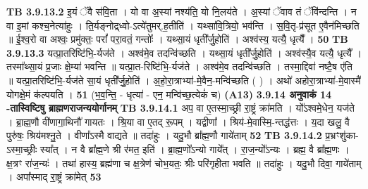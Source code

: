 \documentclass[17pt]{extarticle}
\begin{document}
{{{{{{{{{{{{{{{{{{{{{{                  \newline
                                \textbf{ TB 3.9.13.2} \newline
                  इ॒यं ॅवै स॑वि॒ता । यो वा अ॒स्यां नश्य॑ति॒ यो नि॒लय॑ते । अ॒स्यां ॅवाव तं ॅवि॑न्दन्ति । न वा इ॒मां कश्च॒नेत्या॑हुः । ति॒र्यङ्नोद्र्ध्वो-ऽत्ये॑तुमर्.ह॒तीति॑ । यथ्सा॑वि॒त्रियो॒ भव॑न्ति । स॒वि॒तृ-प्र॑सूत ए॒वैन॑मिच्छति ॥ ई॒श्व॒रो वा अश्वः॒ प्रमु॑क्तः॒ परां᳚ परा॒वतं॒ गन्तोः᳚ । यथ्सा॒यं धृती᳚र्जु॒होति॑ । अश्व॑स्य॒ यत्यै॒ धृत्यै᳚ । \textbf{ 50} \newline
                  \newline
                                \textbf{ TB 3.9.13.3} \newline
                  यत्प्रा॒तरिष्टि॑भि॒-र्यज॑ते । अश्व॑मे॒व तदन्वि॑च्छति । यथ्सा॒यं धृती᳚र्जु॒होति॑ । अश्व॑स्यै॒व यत्यै॒ धृत्यै᳚ । तस्मा᳚थ्सा॒यं प्र॒जाः क्षे॒म्या॑ भवन्ति ॥ यत्प्रा॒त-रिष्टि॑भि॒-र्यज॑ते । अश्व॑मे॒व तदन्वि॑च्छति । तस्मा॒द्दिवा॑ नष्टै॒ष ए॑ति ॥ यत्प्रा॒तरिष्टि॑भि॒-र्यज॑ते सा॒यं धृती᳚र्जु॒होति॑ । अ॒हो॒रा॒त्राभ्या॑-मे॒वैन॒-मन्वि॑च्छति ( ) । अथो॑ अहोरा॒त्राभ्या॑-मे॒वास्मै॑ योगक्षे॒मं क॑ल्पयति । \textbf{ 51} \newline
                  \newline
                                    (भ॒व॒न्ति॒ - धृत्या॑ - एन॒ मन्वि॑च्छ॒त्येकं॑ च) \textbf{(A13)} \newline \newline
                \textbf{ 3.9.14    अनुवाकं   14 -तास्विष्टिषु ब्राह्मणराजन्ययोर्गानम्} \newline
                                \textbf{ TB 3.9.14.1} \newline
                  अप॒ वा ए॒तस्मा॒च्छ्री रा॒ष्ट्रं क्रा॑मति । यो᳚ऽश्वमे॒धेन॒ यज॑ते । ब्रा॒ह्म॒णौ वी॑णागा॒थिनौ॑ गायतः । श्रि॒या वा ए॒तद् रू॒पम् । यद्वीणा᳚ । श्रिय॑-मे॒वास्मि॒-न्तद्ध॑त्तः । य॒दा खलु॒ वै पुरु॑षः॒ श्रिय॑मश्नु॒ते । वीणा᳚ऽस्मै वाद्यते ॥ तदा॑हुः । यदु॒भौ ब्रा᳚ह्म॒णौ गाये॑ताम् \textbf{ 52} \newline
                  \newline
                                \textbf{ TB 3.9.14.2} \newline
                  प्र॒भ्रꣳशु॑का-ऽस्मा॒च्छ्रीः स्या᳚त् । न वै ब्रा᳚ह्म॒णे श्री र॑मत॒ इति॑ । ब्रा॒ह्म॒णो᳚ऽन्यो गाये᳚त् । रा॒ज॒न्यो᳚ऽन्यः । ब्रह्म॒ वै ब्रा᳚ह्म॒णः । क्ष॒त्रꣳ रा॑ज॒न्यः॑ । तथा॑ हास्य॒ ब्रह्म॑णा च क्ष॒त्रेण॑ चोभ॒यतः॒ श्रीः परि॑गृहीता भवति ॥ तदा॑हुः । यदु॒भौ दिवा॒ गाये॑ताम् । अपा᳚स्माद् रा॒॒ष्ट्रं क्रा॑मेत् \textbf{ 53} \newline
}}}}}}}}}}}}}}}}}}}}}}
\end{document}
